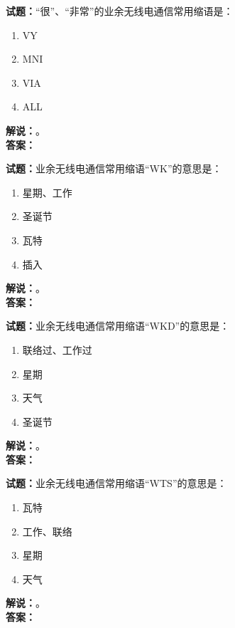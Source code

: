 \documentclass{ctexbook}
\begin{document}
\bigskip




\noindent\textbf{试题：}“很”、“非常”的业余无线电通信常用缩语是：
\begin{enumerate}[leftmargin=3em]
\item VY
\item MNI
\item VIA
\item ALL
\end{enumerate}
\noindent\textbf{解说：}\textbf{}。\\\noindent\textbf{答案：}

\bigskip




\noindent\textbf{试题：}业余无线电通信常用缩语“WK”的意思是：
\begin{enumerate}[leftmargin=3em]
\item 星期、工作
\item 圣诞节
\item 瓦特
\item 插入
\end{enumerate}
\noindent\textbf{解说：}\textbf{}。\\\noindent\textbf{答案：}

\bigskip




\noindent\textbf{试题：}业余无线电通信常用缩语“WKD”的意思是：
\begin{enumerate}[leftmargin=3em]
\item 联络过、工作过
\item 星期
\item 天气
\item 圣诞节
\end{enumerate}
\noindent\textbf{解说：}\textbf{}。\\\noindent\textbf{答案：}

\bigskip




\noindent\textbf{试题：}业余无线电通信常用缩语“WTS”的意思是：
\begin{enumerate}[leftmargin=3em]
\item 瓦特
\item 工作、联络
\item 星期
\item 天气
\end{enumerate}
\noindent\textbf{解说：}\textbf{}。\\\noindent\textbf{答案：}

\bigskip
\end{document}
